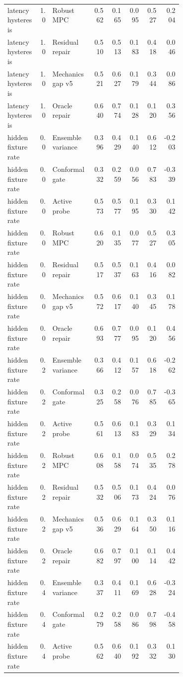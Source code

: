 \documentclass{article}
\begin{document}
\begin{center}
\begin{longtable}{p{0.18\linewidth}rp{0.23\linewidth}rrrrr}
latency hysteresis & 1.0 & Robust MPC & 0.562 & 0.165 & 0.095 & 0.527 & 0.204\\
latency hysteresis & 1.0 & Residual repair & 0.510 & 0.513 & 0.183 & 0.418 & 0.046\\
latency hysteresis & 1.0 & Mechanics gap v5 & 0.521 & 0.627 & 0.179 & 0.344 & 0.086\\
latency hysteresis & 1.0 & Oracle repair & 0.640 & 0.774 & 0.128 & 0.120 & 0.356\\
hidden fixture rate & 0.0 & Ensemble variance & 0.396 & 0.429 & 0.140 & 0.612 & -0.203\\
hidden fixture rate & 0.0 & Conformal gate & 0.332 & 0.259 & 0.056 & 0.783 & -0.339\\
hidden fixture rate & 0.0 & Active probe & 0.573 & 0.577 & 0.195 & 0.330 & 0.142\\
hidden fixture rate & 0.0 & Robust MPC & 0.620 & 0.135 & 0.077 & 0.527 & 0.305\\
hidden fixture rate & 0.0 & Residual repair & 0.517 & 0.537 & 0.163 & 0.416 & 0.082\\
hidden fixture rate & 0.0 & Mechanics gap v5 & 0.572 & 0.617 & 0.140 & 0.345 & 0.178\\
hidden fixture rate & 0.0 & Oracle repair & 0.693 & 0.777 & 0.095 & 0.120 & 0.456\\
hidden fixture rate & 0.2 & Ensemble variance & 0.366 & 0.412 & 0.157 & 0.618 & -0.262\\
hidden fixture rate & 0.2 & Conformal gate & 0.325 & 0.258 & 0.076 & 0.785 & -0.365\\
hidden fixture rate & 0.2 & Active probe & 0.561 & 0.613 & 0.183 & 0.329 & 0.134\\
hidden fixture rate & 0.2 & Robust MPC & 0.608 & 0.158 & 0.074 & 0.535 & 0.278\\
hidden fixture rate & 0.2 & Residual repair & 0.532 & 0.506 & 0.173 & 0.424 & 0.076\\
hidden fixture rate & 0.2 & Mechanics gap v5 & 0.536 & 0.629 & 0.164 & 0.350 & 0.116\\
hidden fixture rate & 0.2 & Oracle repair & 0.682 & 0.797 & 0.100 & 0.114 & 0.442\\
hidden fixture rate & 0.4 & Ensemble variance & 0.337 & 0.411 & 0.169 & 0.628 & -0.324\\
hidden fixture rate & 0.4 & Conformal gate & 0.279 & 0.258 & 0.086 & 0.798 & -0.458\\
hidden fixture rate & 0.4 & Active probe & 0.562 & 0.640 & 0.192 & 0.332 & 0.130\\

\end{longtable}
\end{center}
\end{document}
